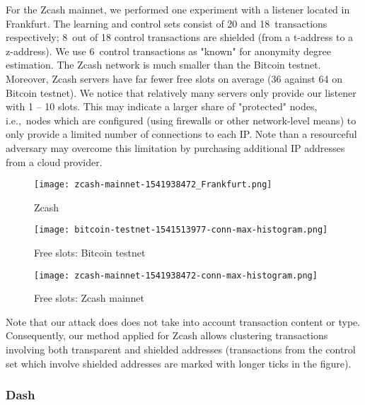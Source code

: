 For the Zcash mainnet, we performed one experiment with a listener located in Frankfurt.
The learning and control sets consist of 20 and 18~transactions respectively; 8~out of 18 control transactions are shielded (from a t-address to a z-address).
We use 6~control transactions as "known" for anonymity degree estimation.
The Zcash network is much smaller than the Bitcoin testnet.
Moreover, Zcash servers have far fewer free slots on average (36 against 64 on Bitcoin testnet).
We notice that relatively many servers only provide our listener with 1 -- 10 slots.
This may indicate a larger share of "protected" nodes, i.e.,~nodes which are configured (using firewalls or other network-level means) to only provide a limited number of connections to each IP.
Note than a resourceful adversary may overcome this limitation by purchasing additional IP addresses from a cloud provider.

\begin{figure}[!t]
	\centering
	\texttt{[image: zcash-mainnet-1541938472\_Frankfurt.png]}
	\caption{Zcash}
	\label{fig:zcash-mainnet}
\end{figure}

\begin{figure*}
	\centering
	\begin{minipage}{0.5\textwidth}
		\centering
		\texttt{[image: bitcoin-testnet-1541513977-conn-max-histogram.png]}
		\caption{Free slots: Bitcoin testnet}
	\end{minipage}\hfill
	\begin{minipage}{0.5\textwidth}
		\centering
		\texttt{[image: zcash-mainnet-1541938472-conn-max-histogram.png]}
		\caption{Free slots: Zcash mainnet}
	\end{minipage}\hfill
	\label{fig:free-slots}
\end{figure*}

Note that our attack does does not take into account transaction content or type.
Consequently, our method applied for Zcash allows clustering transactions involving both transparent and shielded addresses (transactions from the control set which involve shielded addresses are marked with longer ticks in the figure).


\subsubsection{Dash}

